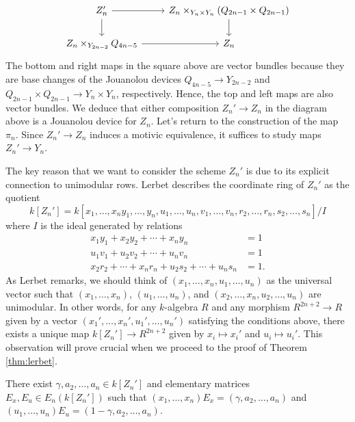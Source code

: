 \[\begin{tikzcd}
	{Z_n'} & {Z_n \times_{Y_n \times Y_n}(Q_{2n-1} \times Q_{2n-1})} \\
	{Z_n\times_{Y_{2n-2}}Q_{4n-5}} & {Z_n}
	\arrow[from=1-1, to=1-2]
	\arrow[from=1-1, to=2-1]
	\arrow[from=1-2, to=2-2]
	\arrow[from=2-1, to=2-2]
\end{tikzcd}\]
The bottom and right maps in the square above are vector bundles because they are base changes of the Jouanolou devices $Q_{4n-5}\to Y_{2n-2}$ and $Q_{2n-1} \times Q_{2n-1} \to Y_n \times Y_n$, respectively. Hence, the top and left maps are also vector bundles. We deduce that either composition $Z_n' \to Z_n$ in the diagram above is a Jouanolou device for $Z_n$. Let's return to the construction of the map $\pi_n$. Since $Z_n' \to Z_n$ induces a motivic equivalence, it suffices to study maps $Z_n' \to Y_n$. 

The key reason that we want to consider the scheme $Z_n'$ is due to its explicit connection to unimodular rows. Lerbet \cite[pg. 27]{Lerbet} describes the  coordinate ring of $Z_n'$ as the quotient 
\[
k[Z_n'] = k[x_1,\ldots,x_ny_1,\ldots,y_n,u_1,\ldots,u_n,v_1,\ldots,v_n,r_2,\ldots,r_n,s_2,\ldots,s_n]/I
\]
where $I$ is the ideal generated by relations
\begin{align*}
    x_1y_1 + x_2y_2 + \cdots + x_ny_n &= 1 \\
    u_1v_1 + u_2v_2 + \cdots + u_nv_n &= 1 \\
    x_2r_2 + \cdots + x_nr_n + u_2s_2 + \cdots + u_ns_n &= 1.
\end{align*}
As Lerbet remarks, we should think of $(x_1,\ldots,x_n,u_1,\ldots,u_n)$ as the universal vector such that $(x_1,\ldots,x_n)$, $(u_1,\ldots,u_n)$, and $(x_2,\ldots,x_n,u_2,\ldots,u_n)$ are unimodular. In other words, for any $k$-algebra $R$ and any morphism $R^{2n+2} \to R$ given by a vector $(x_1',\ldots,x_n',u_1',\ldots,u_n')$ satisfying the conditions above, there exists a unique map $k[Z_n'] \to R^{2n+2}$ given by $x_i \mapsto x_i'$ and $u_i \mapsto u_i'$. This observation will prove crucial when we proceed to the proof of Theorem \ref{thm:lerbet}.

\begin{lemma}\label{lem:univ_mn}
    There exist $\gamma,a_2,\ldots,a_n \in k[Z_n']$ and elementary matrices $E_x,E_u \in E_n(k[Z_n'])$ such that $(x_1,\ldots,x_n)E_x = (\gamma,a_2,\ldots,a_n)$ and $(u_1,\ldots,u_n)E_u = (1-\gamma,a_2,\ldots,a_n)$.
\end{lemma}

